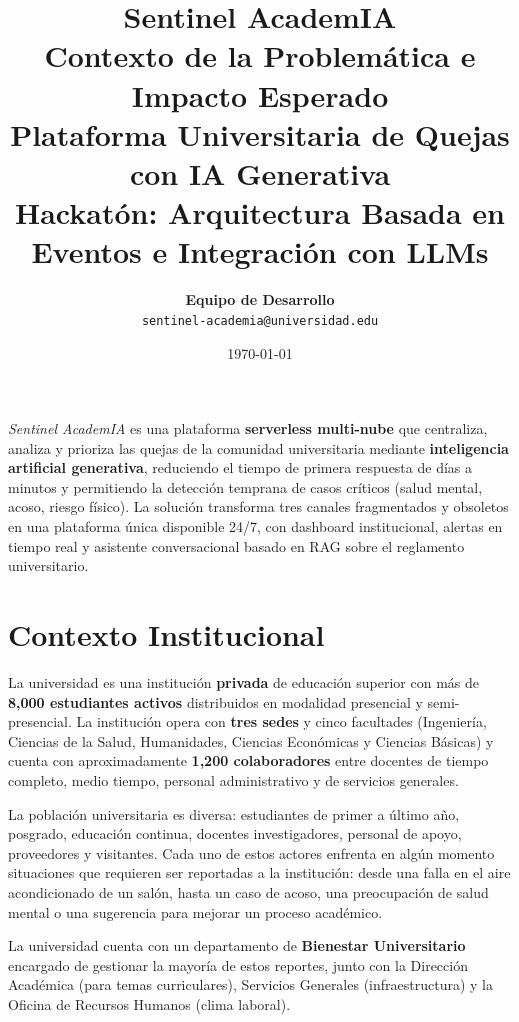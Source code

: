 \documentclass[11pt,a4paper]{article}
\title{
    \vspace{-1cm}
    {\Huge\bfseries\color{primary} Sentinel AcademIA}\\[0.4cm]
    {\Large Contexto de la Problem\'atica e Impacto Esperado}\\[0.6cm]
    {\normalsize Plataforma Universitaria de Quejas con IA Generativa}\\[0.3cm]
    {\small Hackat\'on: Arquitectura Basada en Eventos e Integraci\'on con LLMs}
}
\author{
    \textbf{Equipo de Desarrollo} \\
    \texttt{sentinel-academia@universidad.edu}
}
\date{\today}
\begin{document}
\maketitle
\thispagestyle{fancy}

\begin{tcolorbox}[colback=codebg, colframe=primary, title=\textbf{Resumen Ejecutivo}]
\small
\textit{Sentinel AcademIA} es una plataforma \textbf{serverless multi-nube} que centraliza, analiza y prioriza las quejas de la comunidad universitaria mediante \textbf{inteligencia artificial generativa}, reduciendo el tiempo de primera respuesta de d\'ias a minutos y permitiendo la detecci\'on temprana de casos cr\'iticos (salud mental, acoso, riesgo f\'isico). La soluci\'on transforma tres canales fragmentados y obsoletos en una plataforma \'unica disponible 24/7, con dashboard institucional, alertas en tiempo real y asistente conversacional basado en RAG sobre el reglamento universitario.
\end{tcolorbox}

\tableofcontents
\newpage

\section{Contexto Institucional}

La universidad es una instituci\'on \textbf{privada} de educaci\'on superior con m\'as de \textbf{8,000 estudiantes activos} distribuidos en modalidad presencial y semi-presencial. La instituci\'on opera con \textbf{tres sedes} y cinco facultades (Ingenier\'ia, Ciencias de la Salud, Humanidades, Ciencias Econ\'omicas y Ciencias B\'asicas) y cuenta con aproximadamente \textbf{1,200 colaboradores} entre docentes de tiempo completo, medio tiempo, personal administrativo y de servicios generales.

La poblaci\'on universitaria es diversa: estudiantes de primer a \'ultimo a\~no, posgrado, educaci\'on continua, docentes investigadores, personal de apoyo, proveedores y visitantes. Cada uno de estos actores enfrenta en alg\'un momento situaciones que requieren ser reportadas a la instituci\'on: desde una falla en el aire acondicionado de un sal\'on, hasta un caso de acoso, una preocupaci\'on de salud mental o una sugerencia para mejorar un proceso acad\'emico.

La universidad cuenta con un departamento de \textbf{Bienestar Universitario} encargado de gestionar la mayor\'ia de estos reportes, junto con la Direcci\'on Acad\'emica (para temas curriculares), Servicios Generales (infraestructura) y la Oficina de Recursos Humanos (clima laboral).
\end{document}
